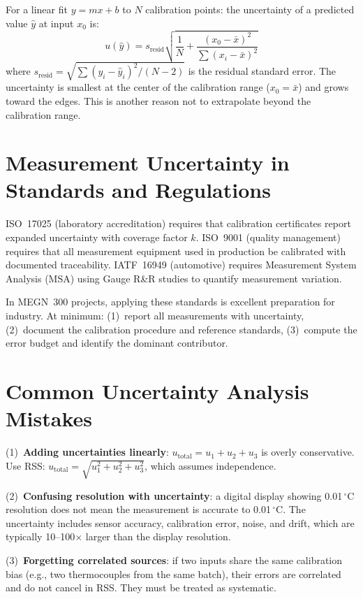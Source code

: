 \documentclass[11pt,letterpaper,twoside,openany]{book}
\newcommand{\degC}{\ensuremath{{}^{\circ}\text{C}}}
\begin{document}
For a linear fit $y = mx + b$ to $N$ calibration points: the uncertainty of a predicted value $\hat{y}$ at input $x_0$ is:
\begin{equation}
u(\hat{y}) = s_{\text{resid}} \sqrt{\frac{1}{N} + \frac{(x_0 - \bar{x})^2}{\sum(x_i - \bar{x})^2}}
\end{equation}
where $s_{\text{resid}} = \sqrt{\sum(y_i - \hat{y}_i)^2/(N-2)}$ is the residual standard error. The uncertainty is smallest at the center of the calibration range ($x_0 = \bar{x}$) and grows toward the edges. This is another reason not to extrapolate beyond the calibration range.

\section{Measurement Uncertainty in Standards and Regulations}
ISO~17025 (laboratory accreditation) requires that calibration certificates report expanded uncertainty with coverage factor $k$. ISO~9001 (quality management) requires that all measurement equipment used in production be calibrated with documented traceability. IATF~16949 (automotive) requires Measurement System Analysis (MSA) using Gauge R\&R studies to quantify measurement variation.

In MEGN~300 projects, applying these standards is excellent preparation for industry. At minimum: (1)~report all measurements with uncertainty, (2)~document the calibration procedure and reference standards, (3)~compute the error budget and identify the dominant contributor.

\section{Common Uncertainty Analysis Mistakes}
(1)~\textbf{Adding uncertainties linearly}: $u_{\text{total}} = u_1 + u_2 + u_3$ is overly conservative. Use RSS: $u_{\text{total}} = \sqrt{u_1^2 + u_2^2 + u_3^2}$, which assumes independence.

(2)~\textbf{Confusing resolution with uncertainty}: a digital display showing 0.01\,\degC{} resolution does not mean the measurement is accurate to 0.01\,\degC{}. The uncertainty includes sensor accuracy, calibration error, noise, and drift, which are typically 10--100$\times$ larger than the display resolution.

(3)~\textbf{Forgetting correlated sources}: if two inputs share the same calibration bias (e.g., two thermocouples from the same batch), their errors are correlated and do not cancel in RSS. They must be treated as systematic.
\end{document}
